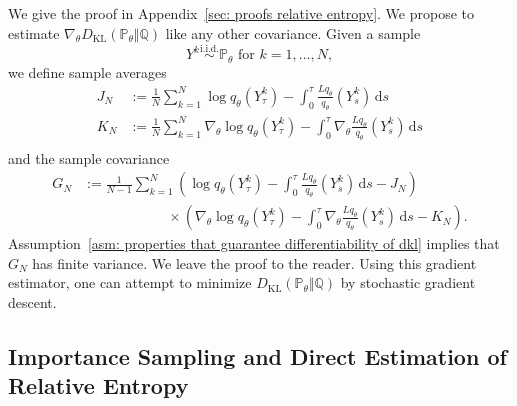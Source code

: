 \documentclass[reqno]{amsart}
\newcommand{\1}{\mathds{1}}
\renewcommand{\d}{\mathrm{d}}
\newcommand{\grad}{\nabla}
\renewcommand{\P}{\mathds{P}}
\newcommand{\Q}{\mathds{Q}}
\newcommand{\dkl}{D_{\mathrm{KL}}}
\theoremstyle{definition}
\theoremstyle{remark}
\begin{document}
We give the proof in Appendix~\ref{sec: proofs relative entropy}. We propose to estimate $\grad_\theta \dkl( \P_\theta \Vert \Q)$ like any other covariance. Given a sample 
\begin{equation*}
   Y^k \overset{\mathrm{i.i.d.}}{\sim}   \P_\theta \text{ for } k = 1, \dots,  N,  
\end{equation*}
we define sample averages
\begin{align*}
  J_N &:= \frac{1}{N} \sum_{k=1}^N  \log q_\theta (Y^k_\tau) - \int_0^\tau \frac{L q_\theta}{q_\theta}(Y^k_s) \, \d s  \\
  K_N &:= \frac{1}{N} \sum_{k=1}^N \grad_\theta \log q_\theta (Y^k_\tau) - \int_0^\tau \grad_\theta \frac{L q_\theta}{q_\theta}(Y^k_s) \, \d s \\
\end{align*}
and the sample covariance
\begin{equation}\label{eq: covariance estimator}
  \begin{split}
G_N &:= \frac{1}{N-1} \sum_{k=1}^N  \left ( \log q_\theta (Y^k_\tau) - \int_0^\tau \frac{L q_\theta}{q_\theta}(Y^k_s) \, \d s  - J_N \right )  \\
    &\qquad \qquad \qquad \times \left ( \grad_\theta \log q_\theta (Y^k_\tau) - \int_0^\tau \grad_\theta \frac{L q_\theta}{q_\theta}(Y^k_s) \, \d s - K_N\right ).
  \end{split}
\end{equation}
Assumption~\ref{asm: properties that guarantee differentiability of dkl} implies that $G_N$ has finite variance. We leave the proof to the reader. Using this gradient estimator, one can attempt to minimize $\dkl(\P_\theta \Vert \Q)$ by stochastic gradient descent. 

\subsection{Importance Sampling and Direct Estimation of Relative Entropy}
\end{document}
